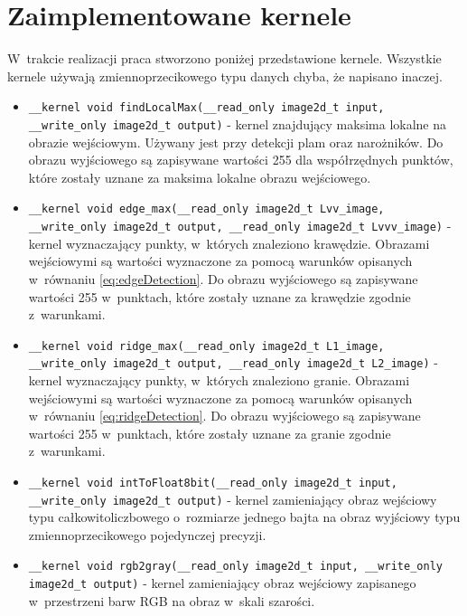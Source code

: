 \chapter{Zaimplementowane kernele}
\label{cha:kernele}

W~trakcie realizacji praca stworzono poniżej przedstawione kernele. Wszystkie kernele używają zmiennoprzecikowego typu danych chyba, że napisano inaczej.

\begin{itemize}
\item 
\texttt{\_\_kernel void findLocalMax(\_\_read\_only image2d\_t input, \_\_write\_only image2d\_t output)} - kernel znajdujący maksima lokalne na obrazie wejściowym. Używany jest przy detekcji plam oraz narożników. Do obrazu wyjściowego są zapisywane wartości 255 dla współrzędnych punktów, które zostały uznane za maksima lokalne obrazu wejściowego.

\item 
\texttt{\_\_kernel void  edge\_max(\_\_read\_only image2d\_t Lvv\_image, \_\_write\_only image2d\_t output, \_\_read\_only image2d\_t Lvvv\_image)} - kernel wyznaczający punkty, w~których znaleziono krawędzie. Obrazami wejściowymi są wartości wyznaczone za pomocą warunków opisanych w~równaniu \ref{eq:edgeDetection}. Do obrazu wyjściowego są zapisywane wartości 255 w~punktach, które zostały uznane za krawędzie zgodnie z~warunkami.

\item 
\texttt{\_\_kernel void  ridge\_max(\_\_read\_only image2d\_t L1\_image, \_\_write\_only image2d\_t output, \_\_read\_only image2d\_t L2\_image)} - kernel wyznaczający punkty, w~których znaleziono granie. Obrazami wejściowymi są wartości wyznaczone za pomocą warunków opisanych w~równaniu \ref{eq:ridgeDetection}. Do obrazu wyjściowego są zapisywane wartości 255 w~punktach, które zostały uznane za granie zgodnie z~warunkami.

\item 
\texttt{\_\_kernel void  intToFloat8bit(\_\_read\_only image2d\_t input, \_\_write\_only image2d\_t output)} - kernel zamieniający obraz wejściowy typu całkowitoliczbowego o~rozmiarze jednego bajta na obraz wyjściowy typu zmiennoprzecikowego pojedynczej precyzji.

\item 
\texttt{\_\_kernel void rgb2gray(\_\_read\_only image2d\_t input, \_\_write\_only image2d\_t output)} - kernel zamieniający obraz wejściowy zapisanego w~przestrzeni barw RGB na obraz w~skali szarości.


\end{itemize}
